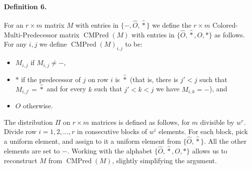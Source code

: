 \paragraph{Definition 6.}
For an $r\times m$ matrix $M$ with entries in $\{-,\widehat O,\widehat *\}$ we define the $r\times m$ Colored-Multi-Predecessor matrix $\operatorname{CMPred}(M)$ with entries in $\{\widehat O,\widehat *,O,*\}$ as follows. For any $i,j$ we define $\operatorname{CMPred}(M)_{i,j}$ to be:
\begin{itemize}
\item $M_{i,j}$ if $M_{i,j}\neq-$,
\item $*$ if the predecessor of $j$ on row $i$ is $\widehat *$ (that is, there is $j'<j$ such that $M_{i,j'}=\widehat *$ and for every $k$ such that $j'<k<j$ we have $M_{i,k}=-$), and
\item $O$ otherwise.
\end{itemize}
The distribution $\Pi$ on $r\times m$ matrices is defined as follows, for $m$ divisible by $w^r$. Divide row $i=1,2,\ldots,r$ in consecutive blocks of $w^i$ elements. For each block, pick a uniform element, and assign to it a uniform element from $\{\widehat O,\widehat *\}$. All the other elements are set to $-$.
Working with the alphabet $\{\widehat O,\widehat *,O,*\}$ allows us to reconstruct $M$ from $\operatorname{CMPred}(M)$, slightly simplifying the argument.
